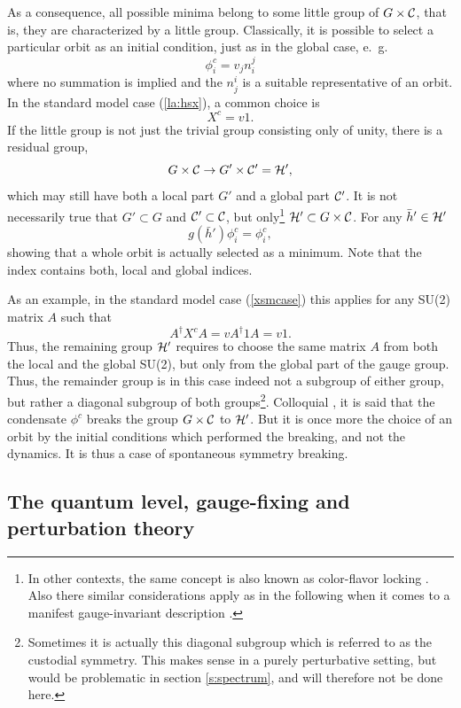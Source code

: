 \documentclass[final,twoside,12pt]{article}
\newcommand*{\no}{\noindent}
\newcommand*{\be}{\begin{equation}}
\newcommand*{\ee}{\end{equation}}
\newcommand*{\pref}[1]{(\ref{#1})}
\newcommand*{\nn}{\nonumber}
\newcommand*{\1}{1\!\!\!\bot}
\begin{document}
As a consequence, all possible minima belong to some little group of $G\times{\cal C}$, that is, they are characterized by a little group. Classically, it is possible to select a particular orbit as an initial condition, just as in the global case, e.\ g.\
\be
\phi_i^c=v_jn_i^j\nn
\ee
\no where no summation is implied and the $n^i_j$ is a suitable representative of an orbit. In the standard model case \pref{la:hsx}, a common choice is
\be
X^c=v1\label{xsmcase}.
\ee
\no If the little group is not just the trivial group consisting only of unity, there is a residual group,
\be
G\times{\cal C}\to G'\times{\cal C'}={\cal H}'\nn,
\ee
\no which may still have both a local part $G'$ and a global part ${\cal C}'$. It is not necessarily true that $G'\subset G$ and ${\cal C}'\subset{\cal C}$, but only\footnote{In other contexts, the same concept is also known as color-flavor locking \cite{Buballa:2003qv,Maas:2012ct}. Also there similar considerations apply as in the following when it comes to a manifest gauge-invariant description \cite{Maas:2012ct,Schafer:1998ef,Alford:1999pa}.} ${\cal H}'\subset G \times{\cal C}$. For any $\bar{h}'\in{\cal H}'$
\be
g(\bar{h}')\phi_i^c=\phi_i^c\nn,
\ee
\no showing that a whole orbit is actually selected as a minimum. Note that the index contains both, local and global indices.

As an example, in the standard model case \pref{xsmcase} this applies for any SU(2) matrix $A$ such that
\be
A^\dagger X^c A=v A^\dagger 1 A=v 1\label{colfmix}.
\ee
\no Thus, the remaining group ${\cal H}'$ requires to choose the same matrix $A$ from both the local and the global SU(2), but only from the global part of the gauge group. Thus, the remainder group is in this case indeed not a subgroup of either group, but rather a diagonal subgroup of both groups\footnote{Sometimes it is actually this diagonal subgroup which is referred to as the custodial symmetry. This makes sense in a purely perturbative setting, but would be problematic in section \ref{s:spectrum}, and will therefore not be done here.}. Colloquial \cite{Bohm:2001yx}, it is said that the condensate $\phi^c$ breaks the group $G\times{\cal C}$ to ${\cal H}'$. But it is once more the choice of an orbit by the initial conditions which performed the breaking, and not the dynamics. It is thus a case of spontaneous symmetry breaking.

\subsection{The quantum level, gauge-fixing and perturbation theory}\label{ss:qulev}
\end{document}
